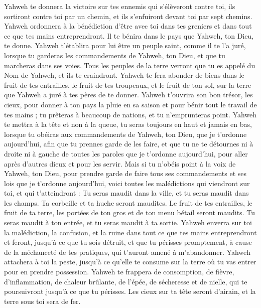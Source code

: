 \begin{multicols}{2}
Yahweh te donnera la victoire sur tes ennemis qui s'élèveront contre toi, ils sortiront contre toi par un chemin, et ils s'enfuiront devant toi par sept chemins.
Yahweh ordonnera à la bénédiction d'être avec toi dans tes greniers et dans tout ce que tes mains entreprendront. Il te bénira dans le pays que Yahweh, ton Dieu, te donne.
Yahweh t'établira pour lui être un peuple saint, comme il te l'a juré, lorsque tu garderas les commandements de Yahweh, ton Dieu, et que tu marcheras dans ses voies.
Tous les peuples de la terre verront que tu es appelé du Nom de Yahweh, et ils te craindront.
Yahweh te fera abonder de biens dans le fruit de tes entrailles, le fruit de tes troupeaux, et le fruit de ton sol, sur la terre que Yahweh a juré à tes pères de te donner.
Yahweh t'ouvrira son bon trésor, les cieux, pour donner à ton pays la pluie en sa saison et pour bénir tout le travail de tes mains ; tu prêteras à beaucoup de nations, et tu n'emprunteras point.
Yahweh te mettra à la tête et non à la queue, tu seras toujours en haut et jamais en bas, lorsque tu obéiras aux commandements de Yahweh, ton Dieu, que je t'ordonne aujourd'hui, afin que tu prennes garde de les faire,
et que tu ne te détournes ni à droite ni à gauche de toutes les paroles que je t'ordonne aujourd'hui, pour aller après d'autres dieux et pour les servir.
Mais si tu n'obéis point à la voix de Yahweh, ton Dieu, pour prendre garde de faire tous ses commandements et ses lois que je t'ordonne aujourd'hui, voici toutes les malédictions qui viendront sur toi, et qui t'atteindront :
Tu seras maudit dans la ville, et tu seras maudit dans les champs.
Ta corbeille et ta huche seront maudites.
Le fruit de tes entrailles, le fruit de ta terre, les portées de ton gros et de ton menu bétail seront maudits.
Tu seras maudit à ton entrée, et tu seras maudit à ta sortie.
Yahweh enverra sur toi la malédiction, la confusion, et la ruine dans tout ce que tes mains entreprendront et feront, jusqu'à ce que tu sois détruit, et que tu périsses promptement, à cause de la méchanceté de tes pratiques, qui t'auront amené à m'abandonner.
Yahweh attachera à toi la peste, jusqu'à ce qu'elle te consume sur la terre où tu vas entrer pour en prendre possession.
Yahweh te frappera de consomption, de fièvre, d'inflammation, de chaleur brûlante, de l'épée, de sécheresse et de nielle, qui te poursuivront jusqu'à ce que tu périsses.
Les cieux sur ta tête seront d'airain, et la terre sous toi sera de fer.

\end{multicols}
